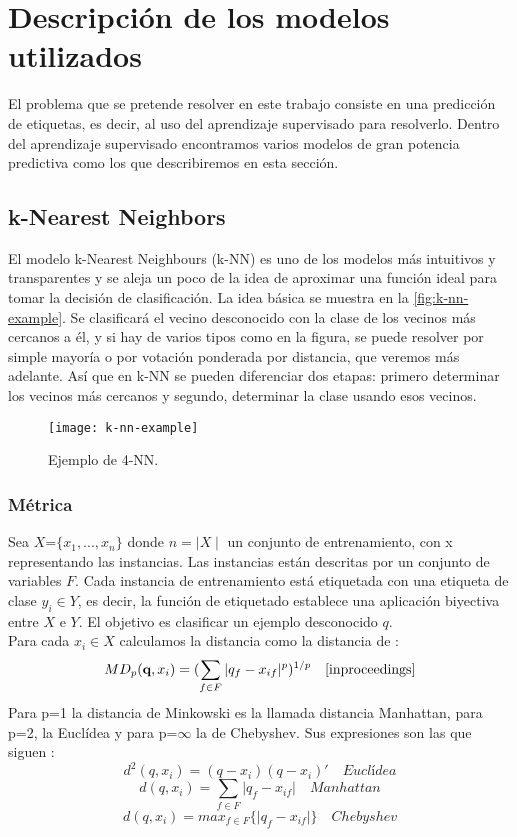 \section{Descripción de los modelos utilizados}\label{st:modelos-utilizados}
El problema que se pretende resolver en este trabajo consiste en una predicción de etiquetas, es decir, al uso del aprendizaje supervisado para resolverlo. Dentro del aprendizaje supervisado encontramos varios modelos de gran potencia predictiva como los que describiremos en esta sección.
\subsection{k-Nearest Neighbors}\label{sst:k-nn}
El modelo k-Nearest Neighbours (k-NN) es uno de los modelos más intuitivos y transparentes y se aleja un poco de la idea de aproximar una función ideal para tomar la decisión de clasificación. La idea básica se muestra en la \autoref{fig:k-nn-example}. Se clasificará el vecino desconocido con la clase de los vecinos más cercanos a él, y si hay de varios tipos como en la figura, se puede resolver por simple mayoría o por votación ponderada por distancia, que veremos más adelante. Así que en k-NN se pueden diferenciar dos etapas: primero determinar los vecinos más cercanos y segundo, determinar la clase usando esos vecinos. \cite{padraiddelany2007k}

\begin{figure}[H]
  \centering
  \texttt{[image: k-nn-example]}
  \caption{Ejemplo de 4-NN.}
  \label{fig:k-nn-example}
\end{figure}
\begin{center}
\cite{peterson2009k}
\end{center}

\subsubsection{Métrica}
Sea $X$=$\lbrace x_{1},...,x_{n} \rbrace$ donde $n=\mid X \mid$ un conjunto de entrenamiento, con x representando las instancias. Las instancias están descritas por un conjunto de variables $F$. Cada instancia de entrenamiento está etiquetada con una etiqueta de clase $y_{i} \in Y$, es decir, la función de etiquetado establece una aplicación biyectiva entre $X$ e $Y$. El objetivo es clasificar un ejemplo desconocido \textbf{$q$}.\cite{padraiddelany2007k}\\
Para cada $x_{i} \in X$ calculamos la distancia como la distancia de :
\[ MD_{p}(\textbf{q},x_{i})= (\sum_{f \in F}  \vert q_{f} - x_{if} \vert ^{p})^{1/p} \quad \cite{inproceedings} \] 
Para p=1 la distancia de Minkowski es la llamada distancia Manhattan, para p=2, la Euclídea y para p=$\infty$ la de Chebyshev. Sus expresiones son las que siguen \cite{inproceedings}:
\[ d^{2}(q,x_{i})= (q-x_{i})(q-x_{i})' \quad Euclídea \]
\[ d(q,x_{i})=\sum_{f \in F}  \vert q_{f} - x_{if} \vert \quad  Manhattan \]
\[ d(q,x_{i})=max_{f \in F} \lbrace \vert q_{f} - x_{if} \vert \rbrace \quad Chebyshev \]

